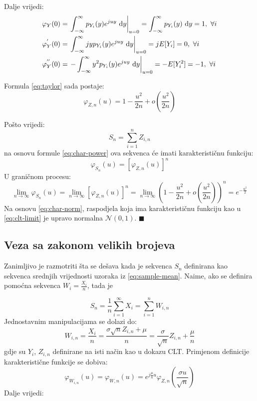 Dalje vrijedi:
\begin{align*}
  \varphi_Y(0)
    &= \left.\int_{-\infty}^{\infty} p_{Y_i}(y) e^{juy} \ \text dy\right|_{u=0}
    = \int_{-\infty}^{\infty} p_{Y_i}(y) \ \text dy = 1,\  \forall i \\
  \varphi_Y^{'}(0)
    &= \left.\int_{-\infty}^{\infty} jyp_{Y_i}(y)e^{juy} \ \text dy \right|_{u=0}
    = jE[Y_i] = 0,\ \forall i \\
  \varphi_Y^{''}(0)
    &= \left.-\int_{-\infty}^{\infty} y^2 p_{Y_i}(y)e^{juy} \ \text dy\right|_{u=0}
    = -E[Y_i^2] = -1,\ \forall i
\end{align*}

Formula \eqref{eq:taylor} sada postaje:
\begin{equation}
  \varphi_{Z,n}(u) = 1 - \frac{u^2}{2n} + o\left(\frac{u^2}{2n}\right)
\end{equation}

Pošto vrijedi:
\begin{equation}
  S_n = \sum_{i=1}^{n} Z_{i,n}
\end{equation}
na osnovu formule \eqref{eq:char-power} ova sekvenca će imati karakterističnu
funkciju:
\begin{equation}
  \varphi_{S_n}(u) = \left[\varphi_{Z,n}(u)\right]^n
\end{equation}
U graničnom procesu:
\begin{equation} \label{eq:clt-limit}
  \lim_{n\to\infty} \varphi_{S_n}(u)
  = \lim_{n\to\infty} [\varphi_{Z,n}(u)]^n
  = \lim_{n\to\infty}
    \left(1 - \frac{u^2}{2n} + o\left(\frac{u^2}{2n}\right)\right)^n
    = e^{-\frac{u^2}{2}}
\end{equation}
Na osnovu \eqref{eq:char-norm}, raspodjela koja ima karakterističnu funkciju kao
u \eqref{eq:clt-limit} je upravo normalna $\mathcal{N}(0,1)$. $\blacksquare$ \\

\subsection{Veza sa zakonom velikih brojeva} \label{sec:clt-lln}

Zanimljivo je razmotriti šta se dešava kada je sekvenca $S_n$ definirana kao
sekvenca srednjih vrijednosti uzoraka iz \eqref{eq:sample-mean}. Naime, ako se
definira pomoćna sekvenca $W_i = \frac{X_i}{n}$, tada je

\begin{equation}
  S_n = \frac{1}{n}\sum_{i=1}^{\infty} X_i = \sum_{i=1}^{n} W_{i,n}
\end{equation}
%
Jednostavnim manipulacijama se dolazi do:
\begin{equation}
  W_{i,n} = \frac{X_i}{n} = \frac{\sigma \sqrt{n} Z_{i,n}+\mu}{n}
  = \frac{\sigma}{\sqrt{n}} Z_{i,n} + \frac{\mu}{n}
\end{equation}
gdje su $Y_i$, $Z_{i,n}$ definirane na isti način kao u dokazu CLT.
%
Primjenom definicije karakteristične funkcije se dobiva:
\begin{equation}
  \varphi_{W_{i,n}}(u) = \varphi_{W,n}(u)
  = e^{j\frac{\mu}{n} u} \varphi_{Z,n}\left(\frac{\sigma u}{\sqrt{n}}\right)
\end{equation}
%
Dalje vrijedi:


